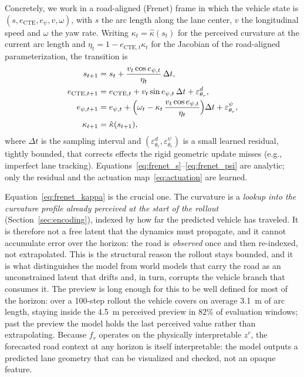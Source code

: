 \documentclass[preprint,12pt]{elsarticle}
\newcommand{\zr}{z^{r}}      %
\begin{document}
Concretely, we work in a road-aligned (Frenet) frame in which the vehicle state
is $(s, e_{\mathrm{CTE}}, e_\psi, v, \omega)$, with $s$ the arc length along the
lane center, $v$ the longitudinal speed and $\omega$ the yaw rate.
Writing $\kappa_t = \hat{\kappa}(s_t)$ for the perceived curvature at the current
arc length and $\eta_t = 1 - e_{\mathrm{CTE},t}\kappa_t$ for the Jacobian of the
road-aligned parameterization, the transition is
\begin{align}
    s_{t+1} &= s_t + \frac{v_t\cos e_{\psi,t}}{\eta_t}\,\Delta t,
        \label{eq:frenet_s}\\
    e_{\mathrm{CTE},t+1} &= e_{\mathrm{CTE},t}
        + v_t \sin e_{\psi,t}\,\Delta t + \varepsilon^d_{\theta_r},
        \label{eq:frenet_d}\\
    e_{\psi,t+1} &= e_{\psi,t}
        + \Bigl(\omega_t - \kappa_t\,\frac{v_t\cos e_{\psi,t}}{\eta_t}\Bigr)\Delta t
        + \varepsilon^\psi_{\theta_r},
        \label{eq:frenet_psi}\\
    \kappa_{t+1} &= \hat{\kappa}(s_{t+1}),
        \label{eq:frenet_kappa}
\end{align}
where $\Delta t$ is the sampling interval and
$(\varepsilon^d_{\theta_r}, \varepsilon^\psi_{\theta_r})$ is a small learned
residual, tightly bounded, that corrects effects the rigid geometric update
misses (e.g., imperfect lane tracking).
Equations~\eqref{eq:frenet_s}--\eqref{eq:frenet_psi} are analytic; only the
residual and the actuation map~\eqref{eq:actuation} are learned.

Equation~\eqref{eq:frenet_kappa} is the crucial one.
The curvature is a \emph{lookup into the curvature profile already perceived at
the start of the rollout} (Section~\ref{sec:encoding}), indexed by how far the
predicted vehicle has traveled.
It is therefore not a free latent that the dynamics must propagate, and it cannot
accumulate error over the horizon: the road is \emph{observed} once and then
re-indexed, not extrapolated.
This is the structural reason the rollout stays bounded, and it is what
distinguishes the model from world models that carry the road as an unconstrained
latent that drifts and, in turn, corrupts the vehicle branch that consumes it.
The preview is long enough for this to be well defined for most of the horizon:
over a 100-step rollout the vehicle covers on average \SI{3.1}{m} of arc length,
staying inside the \SI{4.5}{m} perceived preview in $82\%$ of evaluation windows;
past the preview the model holds the last perceived value rather than
extrapolating.
Because $f_r$ operates on the physically interpretable $\zr$, the forecasted road
context at any horizon is itself interpretable: the model outputs a predicted
lane geometry that can be visualized and checked, not an opaque feature.
\end{document}
